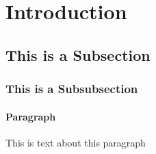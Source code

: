 \section{Introduction}

\subsection{This is a Subsection}


\subsubsection{This is a Subsubsection}


\paragraph{Paragraph} This is text about this paragraph